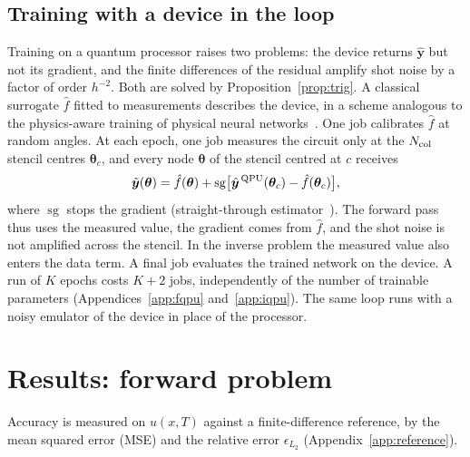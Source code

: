 \documentclass[floatfix,aps,pra,twocolumn,superscriptaddress,10pt,nofootinbib]{revtex4-2}
\newcommand{\sg}{\operatorname{sg}}
\newcommand{\Ncol}{N_{\rm col}}
\begin{document}
\subsection{Training with a device in the loop}\label{sec:hil}
Training on a quantum processor raises two problems: the device returns $\hat{\bm y}$ but not its gradient, and the finite differences of the residual amplify shot noise by a factor of order $h^{-2}$. Both are solved by Proposition~\ref{prop:trig}. A classical surrogate $\hat f$ fitted to measurements describes the device, in a scheme analogous to the physics-aware training of physical neural networks~\cite{wright2022deep}. One job calibrates $\hat f$ at random angles. At each epoch, one job measures the circuit only at the $\Ncol$ stencil centres $\bm\theta_c$, and every node $\bm\theta$ of the stencil centred at $c$ receives
\begin{equation}
  \tilde{\bm y}(\bm\theta)=\hat f(\bm\theta)+\sg\!\big[\hat{\bm y}^{\,\rm QPU}(\bm\theta_c)-\hat f(\bm\theta_c)\big],
  \label{eq:ste}
\end{equation}
where $\sg$ stops the gradient (straight-through estimator~\cite{bengio2013estimating}). The forward pass thus uses the measured value, the gradient comes from $\hat f$, and the shot noise is not amplified across the stencil. In the inverse problem the measured value also enters the data term. A final job evaluates the trained network on the device. A run of $K$ epochs costs $K+2$ jobs, independently of the number of trainable parameters (Appendices~\ref{app:fqpu} and~\ref{app:iqpu}). The same loop runs with a noisy emulator of the device in place of the processor.

\section{Results: forward problem}\label{sec:forward}
Accuracy is measured on $u(x,T)$ against a finite-difference reference, by the mean squared error (MSE) and the relative error $\epsilon_{L_2}$ (Appendix~\ref{app:reference}).
\end{document}
